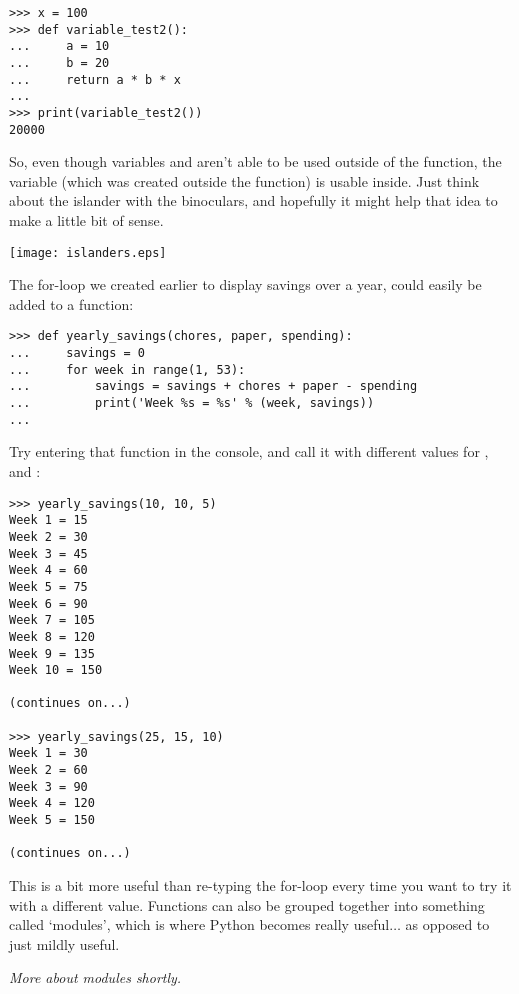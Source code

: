 \begin{listing}
\begin{verbatim}
>>> x = 100
>>> def variable_test2():
...     a = 10
...     b = 20
...     return a * b * x
... 
>>> print(variable_test2())
20000
\end{verbatim}
\end{listing}

So, even though variables  and  aren't able to be used outside of the function, the variable  (which was created outside the function) is usable inside.  Just think about the islander with the binoculars, and hopefully it might help that idea to make a little bit of sense.

\begin{center}
\texttt{[image: islanders.eps]}
\end{center}

The for-loop we created earlier to display savings over a year, could easily be added to a function:

\begin{listing}
\begin{verbatim}
>>> def yearly_savings(chores, paper, spending):
...     savings = 0
...     for week in range(1, 53):
...         savings = savings + chores + paper - spending
...         print('Week %s = %s' % (week, savings))
...
\end{verbatim}
\end{listing}

Try entering that function in the console, and call it with different values for ,  and :

\begin{listing}
\begin{verbatim}
>>> yearly_savings(10, 10, 5)
Week 1 = 15
Week 2 = 30
Week 3 = 45
Week 4 = 60
Week 5 = 75
Week 6 = 90
Week 7 = 105
Week 8 = 120
Week 9 = 135
Week 10 = 150

(continues on...)

>>> yearly_savings(25, 15, 10)
Week 1 = 30
Week 2 = 60
Week 3 = 90
Week 4 = 120
Week 5 = 150

(continues on...)
\end{verbatim}
\end{listing}

This is a bit more useful than re-typing the for-loop every time you want to try it with a different value. Functions can also be grouped together into something called `modules', which is where Python becomes really useful$\ldots$ as opposed to just mildly useful.
\par
\noindent
\emph{More about modules shortly.}

